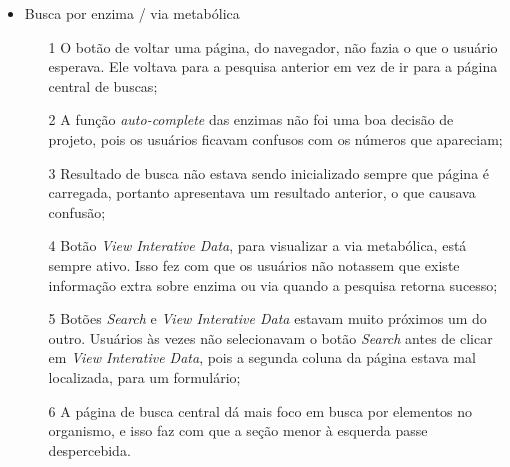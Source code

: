 \begin{itemize}
\item Busca por enzima / via metabólica
  \begin{itemize}
  \item[1] O botão de voltar uma página, do navegador, não fazia o que o usuário esperava. Ele voltava para a pesquisa anterior em vez de ir para a página central de buscas;
  \item[2] A função \textit{auto-complete} das enzimas não foi uma boa decisão de projeto, pois os usuários ficavam confusos com os números que apareciam;
  \item[3] Resultado de busca não estava sendo inicializado sempre que página é carregada, portanto apresentava um resultado anterior, o que causava confusão;
  \item[4] Botão \textit{View Interative Data}, para visualizar a via metabólica, está sempre ativo. Isso fez com que os usuários não notassem que existe informação extra sobre enzima ou via quando a pesquisa retorna sucesso;
  \item[5] Botões \textit{Search} e \textit{View Interative Data} estavam muito próximos um do outro. Usuários às vezes não selecionavam o botão \textit{Search} antes de clicar em \textit{View Interative Data}, pois a segunda coluna da página estava mal localizada, para um formulário;
  \item[6] A página de busca central dá mais foco em busca por elementos no organismo, e isso faz com que a seção menor à esquerda passe despercebida.
  \end{itemize}


\end{itemize}
